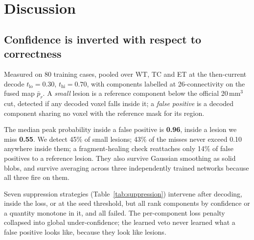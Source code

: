 \documentclass[runningheads]{llncs}
\begin{document}
\section{Discussion}
\label{sec:discussion}

\subsection{Confidence is inverted with respect to correctness}
\label{sec:fp}

Measured on 80 training cases, pooled over WT, TC and ET at the then-current decode
$t_{\mathrm{lo}}=0.30$, $t_{\mathrm{hi}}=0.70$, with components labelled at 26-connectivity on the
fused map $\bar{p}_r$. A \emph{small} lesion is a reference component below the official
20\,mm$^3$ cut, detected if any decoded voxel falls inside it; a \emph{false positive} is a
decoded component sharing no voxel with the reference mask for its region.

The median peak probability inside a false positive is \textbf{0.96}, inside a lesion we miss
\textbf{0.55}. We detect 45\% of small lesions; 43\% of the misses never exceed 0.10 anywhere
inside them; a fragment-healing check reattaches only 14\% of false positives to a reference
lesion. They also survive Gaussian smoothing as solid blobs, and survive averaging across three
independently trained networks because all three fire on them.

Seven suppression strategies (Table~\ref{tab:suppression}) intervene after decoding, inside the
loss, or at the seed threshold, but all rank components by confidence or a quantity monotone in
it, and all failed. The per-component loss penalty collapsed into global under-confidence; the
learned veto never learned what a false positive looks like, because they look like lesions.
\end{document}
